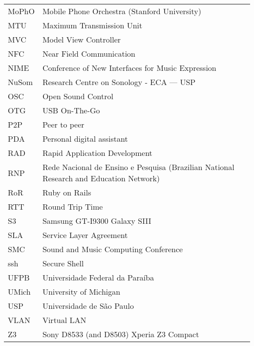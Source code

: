 \documentclass[11pt,twoside,a4paper]{book}
\begin{document}
\begin{longtable}{ll}
		MoPhO		& Mobile Phone Orchestra (Stanford University)\\
		MTU			& Maximum Transmission Unit\\
		MVC         & Model View Controller\\
		NFC         & Near Field Communication\\
		NIME		& Conference of New Interfaces for Music Expression\\
		NuSom		& Research Centre on Sonology - ECA --- USP\\
		OSC		    & Open Sound Control\\
		OTG         & USB On-The-Go\\
		P2P         & Peer to peer\\
		PDA		    & Personal digital assistant\\
		RAD		    & Rapid Application Development\\
		RNP		    & Rede Nacional de Ensino e Pesquisa (Brazilian National Research and Education Network)\\
		RoR		    & Ruby on Rails\\
		RTT		    & Round Trip Time\\
		S3		    & Samsung GT-I9300 Galaxy SIII\\
		SLA			& Service Layer Agreement\\
		SMC		    & Sound and Music Computing Conference\\
		ssh		    & Secure Shell\\
		UFPB	    & Universidade Federal da Paraíba\\
		UMich	    & University of Michigan\\
		USP         & Universidade de São Paulo\\
		VLAN        & Virtual LAN\\
		Z3		    & Sony D8533 (and D8503) Xperia Z3 Compact\\
		
		
	\end{longtable}
	\printnomenclature
	
	
	
\end{document}

